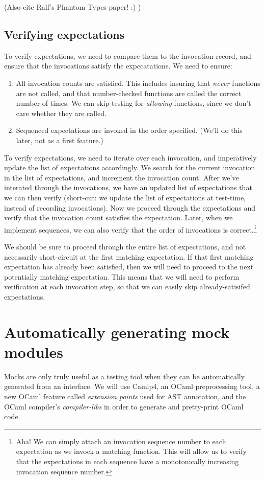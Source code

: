 (Also cite Ralf's Phantom Types paper! :) )

\subsection{Verifying expectations}

To verify expectations, we need to compare them to the invocation
record, and ensure that the invocations satisfy the expecatations. We
need to ensure:

\begin{enumerate}
\item All invocation counts are satisfied. This includes insuring that
  \textit{never} functions are not called, and that number-checked
  functions are called the correct number of times. We can skip
  testing for \textit{allowing} functions, since we don't care whether
  they are called.
\item Sequenced expectations are invoked in the order
  specified. (We'll do this later, not as a first feature.)
\end{enumerate}

To verify expectations, we need to iterate over each invocation, and
imperatively update the list of expectations accordingly. We search
for the current invocation in the list of expectations, and increment
the invocation count. After we've interated through the invocations,
we have an updated list of expectations that we can then verify
(short-cut: we update the list of expectations at test-time, instead
of recording invocations). Now we proceed through the expectations and
verify that the invocation count satisfies the expectation. Later,
when we implement sequences, we can also verify that the order of
invocations is correct.\footnote{Aha! We can simply attach an
  invocation sequence number to each expectation as we invock a
  matching function. This will allow us to verify that the
  expectations in each sequence have a monotonically increasing
  invocation sequence number.}

We should be sure to proceed through the entire list of expectations,
and not necessarily short-circuit at the first matching
expectation. If that first matching expectation has already been
satisfied, then we will need to proceed to the next potentially
matching expectation. This means that we will need to perform
verification at each invocation step, so that we can easily skip
already-satisifed expectations.

\section{Automatically generating mock modules}
\label{application:generation}

Mocks are only truly useful as a testing tool when they can be
automatically generated from an interface. We will use Camlp4, an
OCaml preprocessing tool, a new OCaml feature called \textit{extension
  points} used for AST annotation, and the OCaml compiler's
\textit{compiler-libs} in order to generate and pretty-print OCaml
code.
